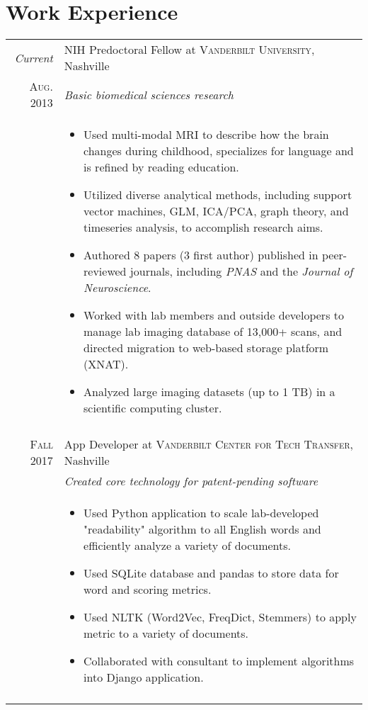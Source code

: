 \documentclass[a4paper,10pt]{article}
\begin{document}
\section{Work Experience}
\begin{tabular}{r|p{11cm}}
 
 	\emph{Current} & NIH Predoctoral Fellow at \textsc{Vanderbilt University}, Nashville \\
 	\textsc{Aug. 2013}&\emph{Basic biomedical sciences research}\\
 	&\footnotesize{
 	\begin{itemize}
    	\item Used multi-modal MRI to describe how the brain changes during childhood, specializes for language and is refined by reading education.
    	\item Utilized diverse analytical methods, including support vector machines, GLM, ICA/PCA, graph theory, and timeseries analysis, to accomplish research aims.
        \item Authored 8 papers (3 first author) published in peer-reviewed journals,  including  \textit{PNAS} and the  \textit{Journal of Neuroscience}.
        \item Worked with lab members and outside developers to manage lab imaging database of 13,000+ scans, and directed migration to web-based storage platform (XNAT).
        \item Analyzed large imaging datasets (up to 1 TB) in a scientific computing cluster.
	\end{itemize}}\\
	\multicolumn{2}{c}{} \\
    
	\textsc{Fall} 2017 & App Developer at \textsc{Vanderbilt Center for Tech Transfer}, Nashville \\
	&\emph{Created core technology for patent-pending software}\\
	&\footnotesize{
	\begin{itemize}
	    \item Used Python application to scale lab-developed "readability" algorithm to all English words and efficiently analyze a variety of documents. 
	    \item Used SQLite database and pandas to store data for word and scoring metrics.
	    \item Used NLTK (Word2Vec, FreqDict, Stemmers) to apply metric to a variety of documents.
	    \item Collaborated with consultant to implement algorithms into Django application. 
    \end{itemize}}\\
 	\multicolumn{2}{c}{} \\


\end{tabular}
\end{document}
